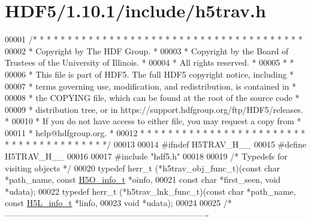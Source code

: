\hypertarget{_h_d_f5_21_810_81_2include_2h5trav_8h_source}{}\section{H\+D\+F5/1.10.1/include/h5trav.h}
\label{_h_d_f5_21_810_81_2include_2h5trav_8h_source}

\begin{DoxyCode}
00001 \textcolor{comment}{/* * * * * * * * * * * * * * * * * * * * * * * * * * * * * * * * * * * * * * *}
00002 \textcolor{comment}{ * Copyright by The HDF Group.                                               *}
00003 \textcolor{comment}{ * Copyright by the Board of Trustees of the University of Illinois.         *}
00004 \textcolor{comment}{ * All rights reserved.                                                      *}
00005 \textcolor{comment}{ *                                                                           *}
00006 \textcolor{comment}{ * This file is part of HDF5.  The full HDF5 copyright notice, including     *}
00007 \textcolor{comment}{ * terms governing use, modification, and redistribution, is contained in    *}
00008 \textcolor{comment}{ * the COPYING file, which can be found at the root of the source code       *}
00009 \textcolor{comment}{ * distribution tree, or in https://support.hdfgroup.org/ftp/HDF5/releases.  *}
00010 \textcolor{comment}{ * If you do not have access to either file, you may request a copy from     *}
00011 \textcolor{comment}{ * help@hdfgroup.org.                                                        *}
00012 \textcolor{comment}{ * * * * * * * * * * * * * * * * * * * * * * * * * * * * * * * * * * * * * * */}
00013 
00014 \textcolor{preprocessor}{#ifndef H5TRAV\_H\_\_}
00015 \textcolor{preprocessor}{#define H5TRAV\_H\_\_}
00016 
00017 \textcolor{preprocessor}{#include "hdf5.h"}
00018 
00019 \textcolor{comment}{/* Typedefs for visiting objects */}
00020 \textcolor{keyword}{typedef} herr\_t (*h5trav\_obj\_func\_t)(\textcolor{keyword}{const} \textcolor{keywordtype}{char} *path\_name, \textcolor{keyword}{const} \hyperlink{struct_h5_o__info__t}{H5O\_info\_t} *oinfo,
00021         \textcolor{keyword}{const} \textcolor{keywordtype}{char} *first\_seen, \textcolor{keywordtype}{void} *udata);
00022 \textcolor{keyword}{typedef} herr\_t (*h5trav\_lnk\_func\_t)(\textcolor{keyword}{const} \textcolor{keywordtype}{char} *path\_name, \textcolor{keyword}{const} \hyperlink{struct_h5_l__info__t}{H5L\_info\_t} *linfo,
00023         \textcolor{keywordtype}{void} *udata);
00024 
00025 \textcolor{comment}{/*-------------------------------------------------------------------------}

\end{DoxyCode}
